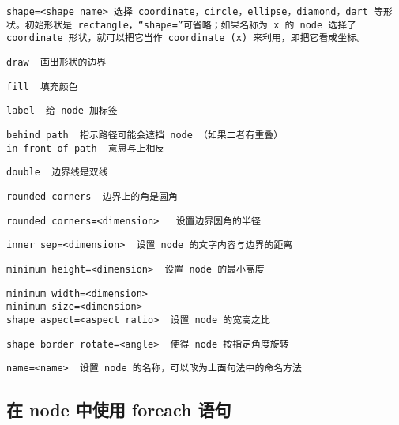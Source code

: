 \documentclass[UTF8]{ctexart}
\begin{document}
\begin{lstlisting}
shape=<shape name> 选择 coordinate，circle，ellipse，diamond，dart 等形状。初始形状是 rectangle，“shape=”可省略；如果名称为 x 的 node 选择了 coordinate 形状，就可以把它当作 coordinate (x) 来利用，即把它看成坐标。
\end{lstlisting}
\begin{lstlisting}
draw  画出形状的边界
\end{lstlisting}
\begin{lstlisting}
fill  填充颜色
\end{lstlisting}
\begin{lstlisting}
label  给 node 加标签
\end{lstlisting}
\begin{lstlisting}
behind path  指示路径可能会遮挡 node （如果二者有重叠）
in front of path  意思与上相反
\end{lstlisting}
\begin{lstlisting}
double  边界线是双线
\end{lstlisting}
\begin{lstlisting}
rounded corners  边界上的角是圆角
\end{lstlisting}
\begin{lstlisting}
rounded corners=<dimension>   设置边界圆角的半径
\end{lstlisting}
\begin{lstlisting}
inner sep=<dimension>  设置 node 的文字内容与边界的距离
\end{lstlisting}
\begin{lstlisting}
minimum height=<dimension>  设置 node 的最小高度
\end{lstlisting}
\begin{lstlisting}
minimum width=<dimension>
minimum size=<dimension>
shape aspect=<aspect ratio>  设置 node 的宽高之比
\end{lstlisting}
\begin{lstlisting}
shape border rotate=<angle>  使得 node 按指定角度旋转
\end{lstlisting}
\begin{lstlisting}
name=<name>  设置 node 的名称，可以改为上面句法中的命名方法
\end{lstlisting}




\subsection{在 node 中使用 foreach 语句}
\end{document}
